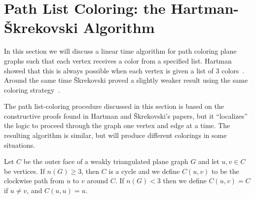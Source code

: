 \documentclass[12pt,letterpaper]{article}
\theoremstyle{plain}
\theoremstyle{definition}
\theoremstyle{break}
\begin{document}
\section{Path List Coloring: the Hartman-\v{S}krekovski Algorithm}

In this section we will discuss a linear time algorithm for path coloring
plane graphs such that each vertex receives a color from a specified list.
Hartman showed that this is always possible when each vertex is given a
list of $3$ colors~\cite[Thm.~4.1]{Har1997}. Around the same
time \v{S}krekovski proved a
slightly weaker result using the same coloring
strategy~\cite[Thm.~2.2b]{Skr1999}.

The path list-coloring procedure discussed in this section is
based on the constructive proofs found in Hartman and
\v{S}krekovski's papers, but it ``localizes'' the logic to proceed through the
graph one vertex and edge at a time. The resulting algorithm is
similar, but will produce different colorings in some situations.

Let $C$ be the outer face of a weakly triangulated plane graph $G$ and let
$u,v\in C$ be vertices.
If $n(G)\ge3$, then $C$ is a cycle and we
define $C(u,v)$ to be the clockwise path
from $u$ to $v$ around $C$. If $n(G)<3$ then we define $C(u,v)=C$ if
$u\ne v$, and $C(u,u)=u$.
\end{document}

